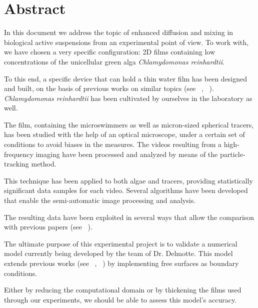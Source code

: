 \chapter*{Abstract}

In this document we address the topic of enhanced diffusion and mixing in biological active suspensions from an experimental point of view. To work with, we have chosen a very specific configuration: 2D films containing low concentrations of the unicellular green alga \textit{Chlamydomonas reinhardtii}.

To this end, a specific device that can hold a thin water film has been designed and built, on the basis of previous works on similar topics (see ~\cite{Sokolov2007}, ~\cite{Guasto}). \textit{Chlamydomonas reinhardtii} has been cultivated by ourselves in the laboratory as well.

The film, containing the microswimmers as well as micron-sized spherical tracers, has been studied with the help of an optical microscope, under a certain set of conditions to avoid biases in the measures. The videos resulting from a high-frequency imaging have been processed and analyzed by means of the particle-tracking method. 

This technique has been applied to both algae and tracers, providing statistically significant data samples for each video. Several algorithms have been developed that enable the semi-automatic image processing and analysis.

The resulting data have been exploited in several ways that allow the comparison with previous papers (see ~\cite{Kurtuldu2011}). 

The ultimate purpose of this experimental project is to validate a numerical model currently being developed by the team of Dr. Delmotte. This model extends previous works (see ~\cite{Delmotte2015}, ~\cite{Delmotte2018}) by implementing free surfaces as boundary conditions.

Either by reducing the computational domain or by thickening the films used through our experiments, we should be able to assess this model's accuracy.
